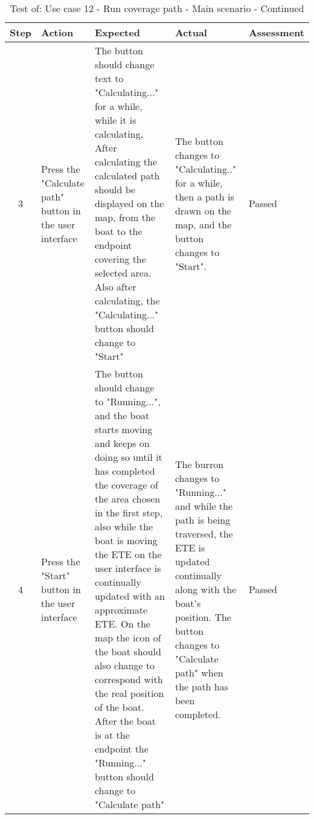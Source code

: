 \begin{table}[H] 			
	\centering
	\begin{tabularx}{\textwidth}{|c|X|X|X|X|}
		\hline
		\bfseries Step  & \bfseries Action &  \bfseries Expected &  \bfseries Actual &  \bfseries Assessment\\ \hline 
		3 & Press the "Calculate path" button in the user interface & The button should change text to "Calculating..." for a while, while it is calculating, After calculating the calculated path should be displayed on the map, from the boat to the endpoint covering the selected area. Also after calculating, the "Calculating..." button should change to "Start" & The button changes to "Calculating.." for a while, then a path is drawn on the map, and the button changes to "Start". & Passed\\ \hline
		4 & Press the "Start" button in the user interface & The button should change to "Running...", and the boat starts moving and keeps on doing so until it has completed the coverage of the area chosen in the first step, also while the boat is moving the ETE on the user interface is continually updated with an approximate ETE. On the map the icon of the boat should also change to correspond with the real position of the boat. After the boat is at the endpoint the "Running..." button should change to "Calculate path" & The burron changes to "Running..." and while the path is being traversed, the ETE is updated continually along with the boat's position. The button changes to "Calculate path" when the path has been completed. & Passed \\ \hline
	\end{tabularx}
	\caption{Test of: Use case 12 - Run coverage path - Main scenario - Continued}
\end{table}

